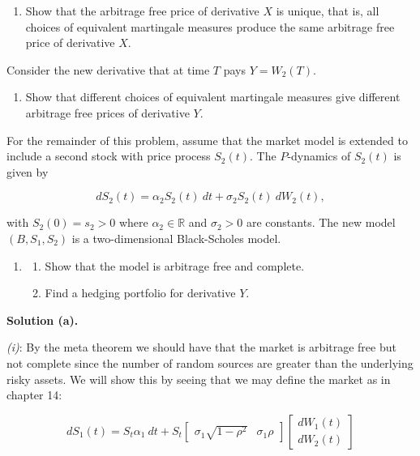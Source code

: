 \documentclass[
]{book}
\providecommand{\tightlist}{%
  \setlength{\itemsep}{0pt}\setlength{\parskip}{0pt}}
\begin{document}
\begin{enumerate}
\def\labelenumi{\alph{enumi}.}
\setcounter{enumi}{2}
\tightlist
\item
  Show that the arbitrage free price of derivative \(X\) is unique, that is, all choices of equivalent martingale measures produce the same arbitrage free price of derivative \(X\).
\end{enumerate}

Consider the new derivative that at time \(T\) pays \(Y=W_2(T)\).

\begin{enumerate}
\def\labelenumi{\alph{enumi}.}
\setcounter{enumi}{3}
\tightlist
\item
  Show that different choices of equivalent martingale measures give different arbitrage free prices of derivative \(Y\).
\end{enumerate}

For the remainder of this problem, assume that the market model is extended to include a second stock with price process \(S_2(t)\). The \(P\)-dynamics of \(S_2(t)\) is given by

\[
dS_2(t)=\alpha_2S_2(t)\ dt+\sigma_2 S_2(t)\ dW_2(t),
\]

with \(S_2(0)=s_2>0\) where \(\alpha_2\in\mathbb{R}\) and \(\sigma_2>0\) are constants. The new model \((B,S_1,S_2)\) is a two-dimensional Black-Scholes model.

\begin{enumerate}
\def\labelenumi{\alph{enumi}.}
\setcounter{enumi}{4}
\item
  \begin{enumerate}
  \def\labelenumii{\roman{enumii}.}
  \tightlist
  \item
    Show that the model is arbitrage free and complete.
  \item
    Find a hedging portfolio for derivative \(Y\).
  \end{enumerate}
\end{enumerate}

\noindent\makebox[\linewidth]{\rule{\textwidth}{0.4pt}}

\textbf{Solution (a).}

\emph{(i)}: By the meta theorem we should have that the market is arbitrage free but not complete since the number of random sources are greater than the underlying risky assets. We will show this by seeing that we may define the market as in chapter 14:

\[
dS_1(t)=S_t \alpha_1\ dt+S_t
\begin{bmatrix}
\sigma_1\sqrt{1-\rho^2} & \sigma_1\rho
\end{bmatrix}
\begin{bmatrix}
dW_1(t)\\
dW_2(t)
\end{bmatrix}
\]
\end{document}
